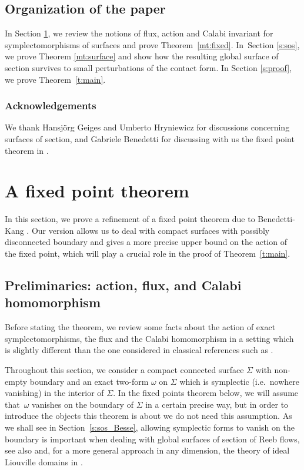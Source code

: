 \documentclass[10pt,a4paper]{amsart}
\providecommand{\ie}{i.e.\ }
\theoremstyle{definition}
\providecommand{\ie}{i.e. }
\begin{document}
\subsection{Organization of the paper}
In Section \ref{s:fixed_point}, we review the notions of flux, action and Calabi invariant for symplectomorphisms of surfaces and prove Theorem~\ref{mt:fixed}. In~Section \ref{s:sos}, we prove Theorem \ref{mt:surface} and show how the resulting global surface of section survives to small perturbations of the contact form. In Section \ref{s:proof}, we prove Theorem~\ref{t:main}.

\subsubsection*{Acknowledgements}
We thank Hansjörg Geiges and Umberto Hryniewicz for discussions concerning surfaces of section, and Gabriele Benedetti for discussing with us the fixed point theorem in \cite{Benedetti:2021aa}.

\section{A fixed point theorem}
\label{s:fixed_point}

In this section, we prove a refinement of a fixed point theorem due to Benedetti-Kang \cite[\S 4.4]{Benedetti:2021aa}. Our version allows us to deal with compact surfaces with possibly disconnected boundary and gives a more precise upper bound on the action of the fixed point, which will play a crucial role in the proof of Theorem~\ref{t:main}.

\subsection{Preliminaries: action, flux, and Calabi homomorphism}
Before stating the theorem, we review some facts about the action of exact symplectomorphisms, the flux and the Calabi homomorphism in a setting which is slightly different than the one considered in classical references such as \cite{Calabi:1970,Banyaga:1978,Banyaga:1997,McDuff:1998uu}.

Throughout this section, we consider a compact connected surface $\Sigma$ with non-empty boundary and an exact two-form $\omega$ on $\Sigma$ which is symplectic (\ie nowhere vanishing) in the interior of $\Sigma$. In the fixed points theorem below, we will assume that~$\omega$ vanishes on the boundary of $\Sigma$ in a certain precise way, but in order to introduce the objects this theorem is about we do not need this assumption. As we shall see in Section~\ref{s:sos_Besse}, allowing symplectic forms to vanish on the boundary is important when dealing with global surfaces of section of Reeb flows, see also \cite{Abbondandolo:2018fb,Benedetti:2021aa} and, for a more general approach in any dimension, the theory of ideal Liouville domains in \cite{Giroux:2020}.
\end{document}
